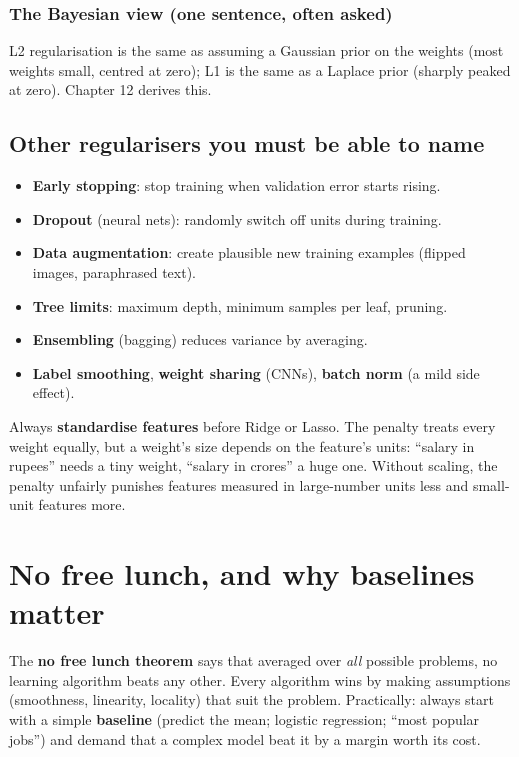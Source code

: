 \subsubsection{The Bayesian view (one sentence, often asked)}
L2 regularisation is the same as assuming a Gaussian prior on the weights (most weights small, centred at
zero); L1 is the same as a Laplace prior (sharply peaked at zero). Chapter 12 derives this.

\subsection{Other regularisers you must be able to name}
\begin{itemize}
\item \textbf{Early stopping}: stop training when validation error starts rising.
\item \textbf{Dropout} (neural nets): randomly switch off units during training.
\item \textbf{Data augmentation}: create plausible new training examples (flipped images, paraphrased text).
\item \textbf{Tree limits}: maximum depth, minimum samples per leaf, pruning.
\item \textbf{Ensembling} (bagging) reduces variance by averaging.
\item \textbf{Label smoothing}, \textbf{weight sharing} (CNNs), \textbf{batch norm} (a mild side effect).
\end{itemize}

\begin{trap}
Always \textbf{standardise features} before Ridge or Lasso. The penalty treats every weight equally, but a
weight's size depends on the feature's units: ``salary in rupees'' needs a tiny weight, ``salary in crores''
a huge one. Without scaling, the penalty unfairly punishes features measured in large-number units less and
small-unit features more.
\end{trap}

\section{No free lunch, and why baselines matter}
The \textbf{no free lunch theorem} says that averaged over \emph{all} possible problems, no learning algorithm
beats any other. Every algorithm wins by making assumptions (smoothness, linearity, locality) that suit the
problem. Practically: always start with a simple \textbf{baseline} (predict the mean; logistic regression;
``most popular jobs'') and demand that a complex model beat it by a margin worth its cost.

